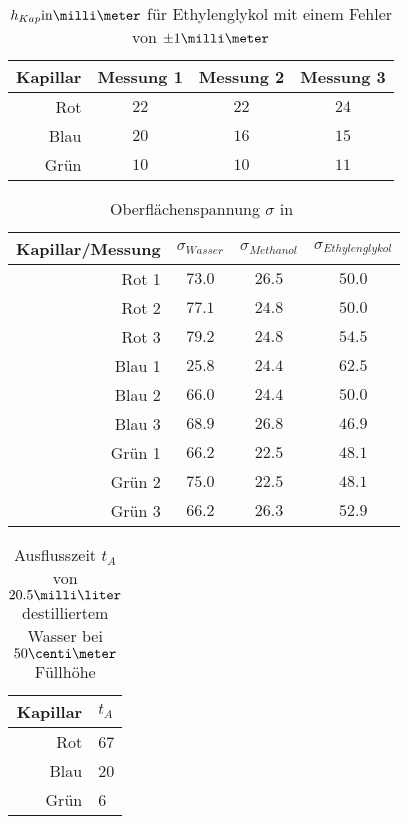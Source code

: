 \documentclass[12pt, a4paper, twoside]{scrartcl}
\begin{document}
\begin{table}
\centering
\begin{tabular}{r|c|c|c}
    Kapillar & Messung 1 & Messung 2 & Messung 3\\
    \hline
    Rot & $22$ & $22$ & $24$\\
    Blau & $20$ & $16$ & $15$ \\
    Grün & $10$ & $10$ & $11$\\
    
 \end{tabular} \label{tab:h_kap_eth}
 \caption{$h_{Kap} \rm{in} \milli\meter$ für Ethylenglykol mit einem Fehler von $\pm 1\milli\meter$}
\end{table}

\begin{table}
\centering
\begin{tabular}{r|c|c|c}
    Kapillar/Messung & $\sigma _{Wasser}$ & $\sigma _{Methanol}$ & $\sigma _{Ethylenglykol}$\\
    \hline
    Rot 1 & $ 73.0$ & $ 26.5$ & $ 50.0$\\
    Rot 2 & $ 77.1$ & $ 24.8$ & $ 50.0$\\
    Rot 3 & $ 79.2$ & $ 24.8$ & $ 54.5$ \\
    \hline
    Blau 1 & $ 25.8$ & $ 24.4$ & $ 62.5$ \\
    Blau 2 & $ 66.0$ & $ 24.4$ & $ 50.0$ \\
    Blau 3 & $ 68.9$ & $ 26.8$ & $ 46.9$ \\
    \hline
    Grün 1 & $ 66.2$ & $ 22.5$ & $ 48.1$ \\
    Grün 2 & $ 75.0$ & $ 22.5$ & $ 48.1$ \\
    Grün 3 & $ 66.2$ & $ 26.3$ & $ 52.9$ \\
    
 \end{tabular} \label{tab:oberflaechenspannung_wasser}
 \caption{Oberflächenspannung $\sigma$ in $ $}
\end{table}




\begin{table}
\centering
\begin{tabular}{rl}
    Kapillar & $t_A$\\
    \hline
    Rot & 67\\
    Blau & 20 \\
    Grün & 6\\
    
 \end{tabular} \label{tab:t_A}
 \caption{Ausflusszeit $t_A$ von $20.5\milli\liter$ destilliertem Wasser bei $50\centi\meter$ Füllhöhe}
\end{table}
\end{document}
